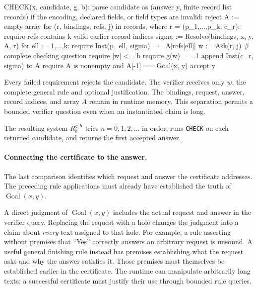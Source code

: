 \documentclass[11pt,twoside]{article}
\theoremstyle{definition}
\newcommand{\Goal}{\operatorname{Goal}}
\begin{document}
\begin{code}
CHECK(x, candidate, g, b):
    parse candidate as (answer y, finite record list records)
    if the encoding, declared fields, or field types are invalid: reject
    A := empty array
    for (r, bindings, refs, j) in records, where r = (p_1,...,p_k; c_r):
        require refs contains k valid earlier record indices
        sigma := Resolve(bindings, x, y, A, r)
        for ell := 1,...,k:
            require Inst(p_ell, sigma) == A[refs[ell]]
        w := Ask(r, j)                  # complete checking question
        require |w| <= b
        require g(w) == 1
        append Inst(c_r, sigma) to A
    require A is nonempty and A[-1] == Goal(x, y)
    accept y
\end{code}
Every failed requirement rejects the candidate. The verifier receives only
$w$, the complete general rule and optional justification. The bindings,
request, answer, record indices, and array $A$ remain in runtime memory. This
separation permits a bounded verifier question even when an instantiated
claim is long.

The resulting system $R^{g,h}_b$ tries $n=0,1,2,\ldots$ in order,
runs \texttt{CHECK} on each returned candidate, and returns the first
accepted answer.

\paragraph{Connecting the certificate to the answer.}
The last comparison identifies which request and answer the certificate
addresses. The preceding rule applications must already have established
the truth of $\Goal(x,y)$.

A direct judgment of $\Goal(x,y)$ includes the actual request and answer
in the verifier query. Replacing the request with a hole changes the
judgment into a claim about \emph{every} text assigned to that hole.
For example, a rule asserting without premises that ``Yes'' correctly
answers an arbitrary request is unsound. A useful general finishing rule
instead has premises establishing what the request asks and why the answer
satisfies it. Those premises must themselves be established earlier in the
certificate. The runtime can manipulate arbitrarily long texts; a successful
certificate must justify their use through bounded rule queries.
\end{document}
